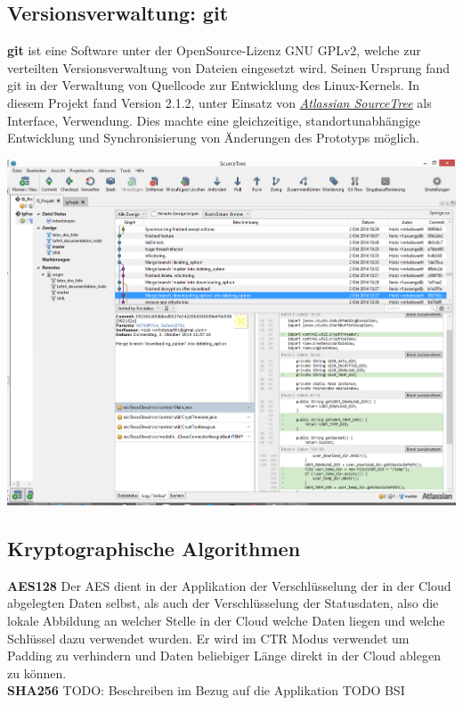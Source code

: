 \documentclass[12pt,a4paper,bibliography=totocnumbered,listof=totocnumbered]{scrartcl}
\begin{document}
\subsection{Versionsverwaltung: git}
\textbf{git} ist eine Software unter der OpenSource-Lizenz GNU GPLv2, welche zur verteilten Versionsverwaltung von Dateien eingesetzt wird. Seinen Ursprung fand git in der Verwaltung von Quellcode zur Entwicklung des Linux-Kernels. In diesem Projekt fand Version 2.1.2, unter Einsatz von \href{https://www.atlassian.com/software/sourcetree/overview}{\textit{Atlassian SourceTree}} als Interface, Verwendung. Dies machte eine gleichzeitige, standortunabhängige Entwicklung und Synchronisierung von Änderungen des Prototyps möglich.
\vspace{1em}
$\;$\\
\begin{minipage}{\linewidth}
	\centering
	\includegraphics[width=1.0\linewidth]{./img/SourceTree.png}
\end{minipage}
\vspace{1em}
  \cite{31}

\subsection{Kryptographische Algorithmen}
\textbf{AES128}
Der AES dient in der Applikation der Verschlüsselung der in der Cloud abgelegten Daten selbst, als auch der Verschlüsselung der Statusdaten, also die lokale Abbildung an welcher Stelle in der Cloud welche Daten liegen und welche Schlüssel dazu verwendet wurden. Er wird im CTR Modus verwendet um Padding zu verhindern und Daten beliebiger Länge direkt in der Cloud ablegen zu können.
\\\textbf{SHA256}
TODO: Beschreiben im Bezug auf die Applikation
TODO BSI
\end{document}
